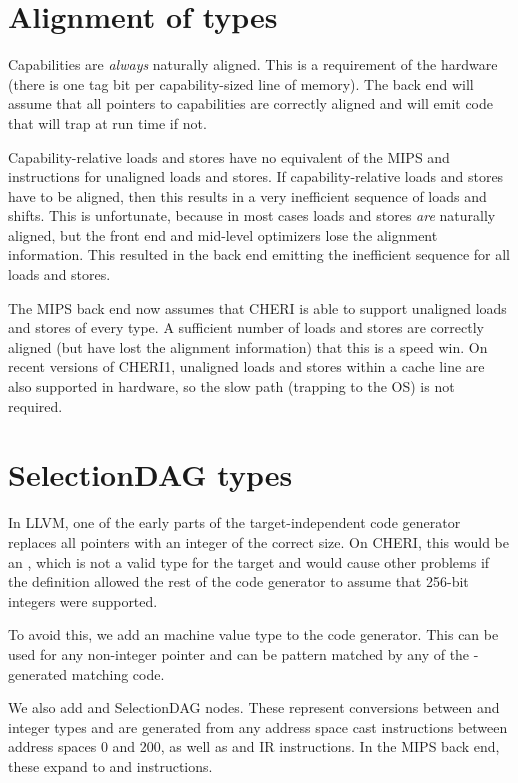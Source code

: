 \section{Alignment of types}

Capabilities are \textit{always} naturally aligned.
This is a requirement of the hardware (there is one tag bit per capability-sized line of memory).
The back end will assume that all pointers to capabilities are correctly aligned and will emit code that will trap at run time if not.

Capability-relative loads and stores have no equivalent of the MIPS  and  instructions for unaligned loads and stores.
If capability-relative loads and stores have to be aligned, then this results in a very inefficient sequence of loads and shifts.
This is unfortunate, because in most cases loads and stores \textit{are} naturally aligned, but the front end and mid-level optimizers lose the alignment information.
This resulted in the back end emitting the inefficient sequence for all loads and stores.

The MIPS back end now assumes that CHERI is able to support unaligned loads and stores of every type.
A sufficient number of loads and stores are correctly aligned (but have lost the alignment information) that this is a speed win.
On recent versions of CHERI1, unaligned loads and stores within a cache line are also supported in hardware, so the slow path (trapping to the OS) is not required.

\section{SelectionDAG types}

In LLVM, one of the early parts of the target-independent code generator replaces all pointers with an integer of the correct size.
On CHERI, this would be an , which is not a valid type for the target and would cause other problems if the definition allowed the rest of the code generator to assume that 256-bit integers were supported.

To avoid this, we add an  machine value type to the code generator.
This can be used for any non-integer pointer and can be pattern matched by any of the  -generated matching code.

We also add  and  SelectionDAG nodes.
These represent conversions between  and integer types and are generated from any address space cast instructions between address spaces 0 and 200, as well as  and  IR instructions.
In the MIPS back end, these expand to  and  instructions.

